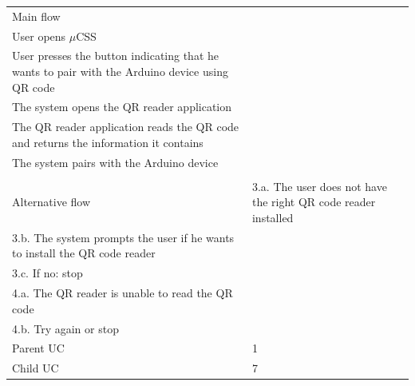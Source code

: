 \begin{table}
\begin{tabular}{|l|l|}
        Main flow        &    \begin{itemize} \\ \item{User opens $\mu$CSS} \\ \item{User presses the button indicating that he wants to pair with the Arduino device using QR code} \\ \item{The system opens the QR reader application} \\ \item{The QR reader application reads the QR code and returns the information it contains} \\ \item{The system pairs with the Arduino device} \\ \end{itemize} \\

 
        Alternative flow & 3.a. The user does not have the right QR code reader installed \\ 3.b. The system prompts the user if he wants to install the QR code reader \\ 3.c. If no: stop \\ 4.a. The QR reader is unable to read the QR code \\ 4.b. Try again or stop                                                             \\ 
        Parent UC        & 1                                                                                                                                                                                                                                                                                                          \\ 
        Child UC         & 7                                                                                                                                                                                                                                                                                                          \\
        \hline
    \end{tabular}
\end{table}

